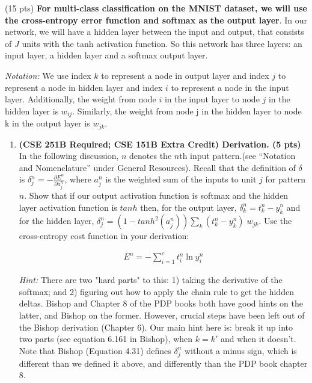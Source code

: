 (15 pts) \textbf{For multi-class classification on the MNIST dataset, we will use the cross-entropy error function and softmax as the output layer}. In our network, we will have a hidden layer between the input and output, that consists of $J$ units with the tanh activation function. So this network has three layers: an input layer, a hidden layer and a softmax output layer.

\textit{Notation:} We use index $k$ to represent a node in output layer and index $j$ to represent a node in hidden layer and index $i$ to represent a node in the input layer. Additionally, the weight from node $i$ in the input layer to node $j$ in the hidden layer is $w_{ij}$. Similarly, the weight from node j in the hidden layer to node k in the output layer is $w_{jk}$.

\begin{enumerate}[label=(\alph*)]
	\item \textbf{(CSE 251B Required; CSE 151B Extra Credit) Derivation. (5 pts)} In the following discussion, $n$ denotes the $n$th input pattern.(see ``Notation and Nomenclature'' under General Resources). Recall that the definition of $\delta$ is $\delta_j^{n}=-\frac{\partial E^{n}}{\partial a_j^{n}}$,
	      where
	      $a_j^{n}$ is the weighted sum of the inputs to unit $j$ for pattern $n$. Show that if our output activation function is softmax and the hidden layer activation function is $tanh$ then, for the output layer, $\delta_{k}^{n}= t_k^n - y_{k}^n$ and for the hidden layer, $\delta_{j}^{n} = (1-tanh^2(a_j^n)) \sum_k (t_k^n - y_{k}^n)\;w_{jk}$. Use the cross-entropy cost function in your derivation:

	      \begin{align}\label{eqn:softmax_cost}
		      E^n = - \sum_{i=1}^c t_i^n \ln y_i^n
	      \end{align}

	      \textit{Hint:} There are two "hard parts" to this: 1)
	      taking the derivative of the softmax; and 2) figuring out
	      how to apply the chain rule to get the hidden deltas. Bishop
	      and Chapter 8 of the PDP books both have good hints on the
	      latter, and Bishop on the former. However, crucial steps
	      have been left out of the Bishop derivation (Chapter 6). Our
	      main hint here is: break it up into two parts (see equation
	      6.161 in Bishop), when $k=k'$ and when it doesn't. Note that
	      Bishop (Equation 4.31) defines $\delta_j^{n}$ without a
	      minus sign, which is different than we defined it above, and
	      differently than the PDP book chapter 8.


\end{enumerate}
